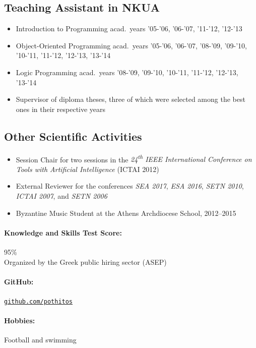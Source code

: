 \documentclass[a4paper]{article}
\begin{document}
\begin{cv}{}
\subsection*{Teaching Assistant in NKUA}
\begin{itemize}
    \item \textsf{Introduction to Programming} acad.\ years
          '05-'06, '06-'07, '11-'12, '12-'13
    \item \textsf{Object-Oriented Programming} acad.\ years
          '05-'06, '06-'07, '08-'09, '09-'10, '10-'11,
          '11-'12, '12-'13, '13-'14
    \item \textsf{Logic Programming} acad.\ years '08-'09,
          '09-'10, '10-'11, '11-'12, '12-'13, '13-'14
    \item \textsf{Supervisor} of diploma theses, three of
          which were selected among the best ones in their
          respective years
\end{itemize}

\subsection*{Other Scientific Activities}
\begin{itemize}
    \item \textsf{Session Chair} for two sessions in the
          \emph{24\textsuperscript{th} IEEE International
          Conference on Tools with Artificial Intelligence}
          (ICTAI 2012)
    \item \textsf{External Reviewer} for the conferences
          \emph{SEA 2017}, \emph{ESA 2016}, \emph{SETN
          2010}, \emph{ICTAI 2007}, and \emph{SETN 2006}
    \item \textsf{Byzantine Music Student} at the Athens
           Archdiocese School, 2012--2015
\end{itemize}

\paragraph{Knowledge and Skills Test Score:} 95\% \\
Organized by the Greek public hiring sector (ASEP)

\paragraph{GitHub:}
\href{https://github.com/pothitos}{\texttt{github.com/pothitos}}

\paragraph{Hobbies:} Football and swimming

\date{}

\end{cv}
\end{document}
